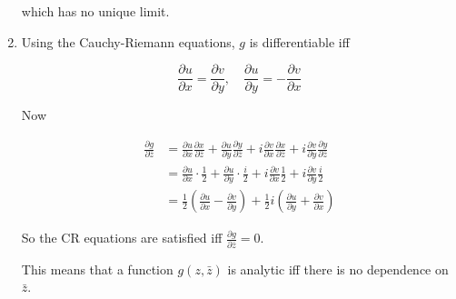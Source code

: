 \documentclass[a4paper]{article}
\begin{document}
\begin{enumerate}
	which has no unique limit.
	
	
	\item Using the Cauchy-Riemann equations, $ g $ is differentiable iff
	
	\[ \frac{\partial u}{\partial x} = \frac{\partial v}{\partial y}, \quad \frac{\partial u}{\partial y} = - \frac{\partial v}{\partial x} \]
	
	Now
	
	\begin{align*}
	\frac{\partial g}{\partial \bar{z}} & = \frac{\partial u }{\partial x} \frac{\partial x }{\partial \bar{z}} + \frac{\partial u }{\partial y} \frac{\partial y }{\partial \bar{z}} + i\frac{\partial v }{\partial x} \frac{\partial x }{\partial \bar{z}} + i\frac{\partial v }{\partial y} \frac{\partial y }{\partial \bar{z}}   \\
	& = \frac{\partial u }{\partial x} \cdot \frac{1}{2}  + \frac{\partial u }{\partial y} \cdot \frac{i}{2} + i\frac{\partial v }{\partial x} \frac{1}{2} + i\frac{\partial v }{\partial y} \frac{i}{2} \\
	& = \frac{1}{2} \left(  \frac{\partial u}{\partial x} - \frac{\partial v }{\partial y} \right) + \frac{1}{2} i \left(  \frac{\partial u }{\partial y}  + \frac{\partial v }{\partial x} \right)  
	\end{align*}
	
	So the CR equations are satisfied iff $ \frac{\partial g}{\partial \bar{z}} = 0 $. 
	
	This means that a function $ g(z,\bar{z}) $ is analytic iff there is no dependence on $ \bar{z} $. 
	
	

\end{enumerate}
\end{document}
